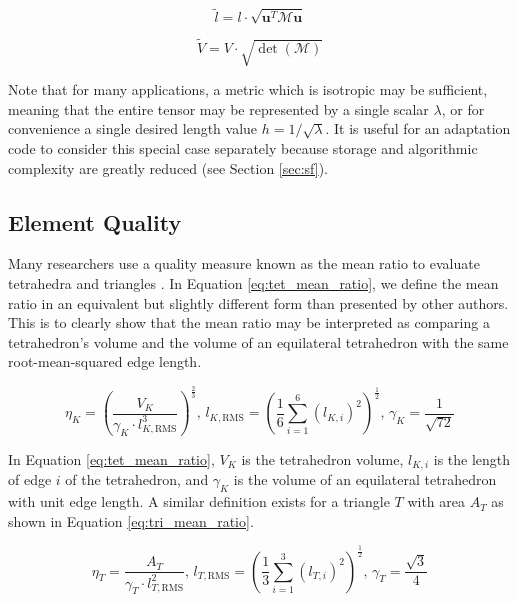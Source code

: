 \begin{equation} \label{eq:metric_length}
\tilde{l} = l \cdot \sqrt{\mathbf{u}^T\mathcal{M}\mathbf{u}}
\end{equation}

\begin{equation} \label{eq:metric_volume}
\tilde{V} = V \cdot \sqrt{\det(\mathcal{M})}
\end{equation}

Note that for many applications, a metric which is isotropic
may be sufficient, meaning that the entire tensor may be represented
by a single scalar $\lambda$, or for convenience a single
desired length value $h=1/\sqrt{\lambda}$.
It is useful for an adaptation code to consider this special case
separately because storage and algorithmic complexity are greatly
reduced (see Section \ref{sec:sf}).

\subsection{Element Quality}
\label{sec:def_quality}

Many researchers use a quality measure known as the mean ratio
to evaluate tetrahedra and triangles
\cite{liu1994relationship,loseille2015parallel,compere2010mesh,
li20053d}.
In Equation \ref{eq:tet_mean_ratio}, we define the mean ratio
in an equivalent but slightly different form than presented by other
authors.
This is to clearly show that the mean ratio may be interpreted
as comparing a tetrahedron's volume and the volume of
an equilateral tetrahedron with the same root-mean-squared edge length.

\begin{equation} \label{eq:tet_mean_ratio}
\eta_K = \left(\frac{V_K}{\gamma_K\cdot l_{K,\text{RMS}}^3}\right)^{\frac23},\,
l_{K,\text{RMS}}=\left(\frac16\sum_{i=1}^6 \left(l_{K,i}\right)^2\right)^\frac12, \,
\gamma_K = \frac{1}{\sqrt{72}}
\end{equation}

In Equation \ref{eq:tet_mean_ratio},
$V_K$ is the tetrahedron volume, $l_{K,i}$ is the
length of edge $i$ of the tetrahedron, and $\gamma_K$ is the volume
of an equilateral tetrahedron with unit edge length.
A similar definition exists for a triangle $T$
with area $A_T$ as shown in Equation \ref{eq:tri_mean_ratio}.

\begin{equation} \label{eq:tri_mean_ratio}
\eta_T = \frac{A_T}{\gamma_T\cdot l_{T,\text{RMS}}^2},\,
l_{T,\text{RMS}}=\left(\frac13\sum_{i=1}^3 \left(l_{T,i}\right)^2\right)^\frac12, \,
\gamma_T = \frac{\sqrt{3}}{4}
\end{equation}

